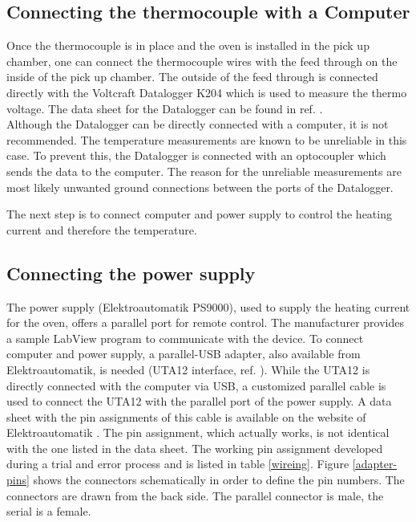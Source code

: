 \documentclass[parskip,12pt,headsepline,a4paper] {scrbook}
\begin{document}
\subsection{Connecting the thermocouple with a Computer}
\vspace{-1\baselineskip}
Once the thermocouple is in place and the oven is installed in the pick up chamber, one can connect the thermocouple wires with the feed through on the inside of the pick up chamber. The outside of the feed through is connected directly with the Voltcraft Datalogger K204 which is used to measure the thermo voltage. The data sheet for the Datalogger can be found in ref. \cite{ref-datalogger}. \\
Although the Datalogger can be directly connected with a computer, it is not recommended. The temperature measurements are known to be unreliable in this case. To prevent this, the Datalogger is connected with an optocoupler which sends the data to the computer. The reason for the unreliable measurements are most likely unwanted ground connections between the ports of the Datalogger.

The next step is to connect computer and power supply to control the heating current and therefore the temperature.

\subsection{Connecting the power supply}
\vspace{-1\baselineskip}
The power supply (Elektroautomatik PS9000), used to supply the heating current for the oven, offers a parallel port for remote control. The manufacturer provides a sample LabView program to communicate with the device. To connect computer and power supply, a parallel-USB adapter, also available from Elektroautomatik, is needed (UTA12 interface, ref. \cite{ref-uta12}). While the UTA12 is directly connected with the computer via USB, a customized parallel cable is used to connect the UTA12 with the parallel port of the power supply. A data sheet with the pin assignments of this cable is available on the website of Elektroautomatik \cite{ref-uta12}. The pin assignment, which actually works, is not identical with the one listed in the data sheet. The working pin assignment developed during a trial and error process and is listed in table \ref{wireing}. Figure \ref{adapter-pins} shows the connectors schematically in order to define the pin numbers. The connectors are drawn from the back side. The parallel connector is male, the serial is a female.
\end{document}

